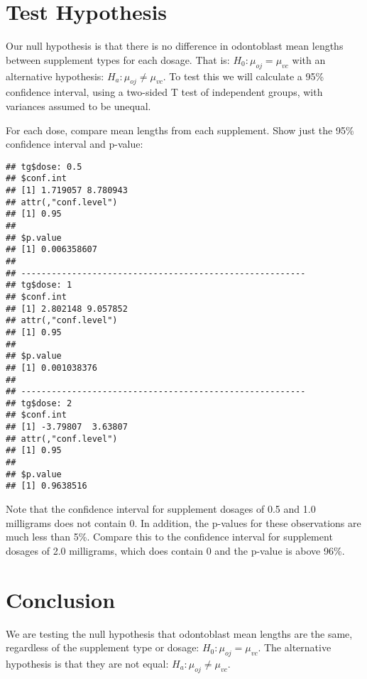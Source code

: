 \documentclass[legalpaper]{article}
\newenvironment{Shaded}{\begin{snugshade}}{\end{snugshade}}
\newcommand{\KeywordTok}[1]{\textcolor[rgb]{0.13,0.29,0.53}{\textbf{{#1}}}}
\newcommand{\StringTok}[1]{\textcolor[rgb]{0.31,0.60,0.02}{{#1}}}
\newcommand{\NormalTok}[1]{{#1}}
\begin{document}
\section{Test Hypothesis}\label{test-hypothesis}

Our null hypothesis is that there is no difference in odontoblast mean
lengths between supplement types for each dosage. That is:
\(H_0 : \mu_{oj} = \mu_{vc}\) with an alternative hypothesis:
\(H_a : \mu_{oj} \ne \mu_{vc}\). To test this we will calculate a 95\%
confidence interval, using a two-sided T test of independent groups,
with variances assumed to be unequal.

For each dose, compare mean lengths from each supplement. Show just the
95\% confidence interval and p-value:

\begin{Shaded}
\end{Shaded}

\begin{verbatim}
## tg$dose: 0.5
## $conf.int
## [1] 1.719057 8.780943
## attr(,"conf.level")
## [1] 0.95
## 
## $p.value
## [1] 0.006358607
## 
## -------------------------------------------------------- 
## tg$dose: 1
## $conf.int
## [1] 2.802148 9.057852
## attr(,"conf.level")
## [1] 0.95
## 
## $p.value
## [1] 0.001038376
## 
## -------------------------------------------------------- 
## tg$dose: 2
## $conf.int
## [1] -3.79807  3.63807
## attr(,"conf.level")
## [1] 0.95
## 
## $p.value
## [1] 0.9638516
\end{verbatim}

Note that the confidence interval for supplement dosages of 0.5 and 1.0
milligrams does not contain 0. In addition, the p-values for these
observations are much less than 5\%. Compare this to the confidence
interval for supplement dosages of 2.0 milligrams, which does contain 0
and the p-value is above 96\%.

\section{Conclusion}\label{conclusion}

We are testing the null hypothesis that odontoblast mean lengths are the
same, regardless of the supplement type or dosage:
\(H_0 : \mu_{oj} = \mu_{vc}\). The alternative hypothesis is that they
are not equal: \(H_a : \mu_{oj} \ne \mu_{vc}\).
\end{document}
